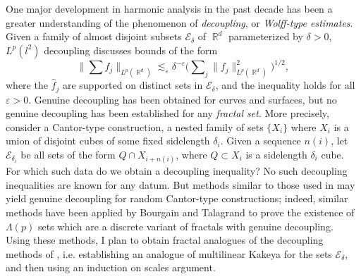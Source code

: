 \documentclass[11pt]{article}
\theoremstyle{definition}
\DeclareMathOperator{\RR}{\mathbb{R}}
\begin{document}
One major development in harmonic analysis in the past decade has been a greater understanding of the phenomenon of \emph{decoupling}, or \emph{Wolff-type estimates}. Given a family of almost disjoint subsets $\mathcal{E}_\delta$ of $\RR^d$ parameterized by $\delta > 0$, $L^p(l^2)$ decoupling discusses bounds of the form
%
\begin{equation} \label{decoupling}
    \Big\| \sum f_j \Big\|_{L^p(\RR^d)} \lesssim_\varepsilon \delta^{-\varepsilon} \Big( \sum\nolimits_j \| f_j \|_{L^p(\RR^d)}^2 \Big)^{1/2},
\end{equation}
%
where the $\widehat{f}_j$ are supported on distinct sets in $\mathcal{E}_\delta$, and the inequality holds for all $\varepsilon > 0$.
Genuine decoupling has been obtained for curves and surfaces, but no genuine decoupling has been established for any \emph{fractal set}. More precisely, consider a Cantor-type construction, a nested family of sets $\{ X_i \}$ where $X_i$ is a union of disjoint cubes of some fixed sidelength $\delta_i$. Given a sequence $n(i)$, let $\mathcal{E}_{\delta_i}$ be all sets of the form $Q \cap X_{i + n(i)}$, where $Q \subset X_i$ is a sidelength $\delta_i$ cube. For which such data do we obtain a decoupling inequality?
No such decoupling inequalities are known for any datum. But methods similar to those used in \cite{DensonFourier} may yield genuine decoupling for random Cantor-type constructions; indeed, similar methods have been applied by Bourgain \cite{Bourgain} and Talagrand \cite{Talagrand} to prove the existence of $\Lambda(p)$ sets %
which are a discrete variant of fractals with genuine decoupling. Using these methods, I plan to obtain fractal analogues of the decoupling methods of \cite{BourgainDemeterStudyGuide}, i.e. establishing an analogue of multilinear Kakeya for the sets $\mathcal{E}_\delta$, and then using an induction on scales argument.

\AtNextBibliography{\footnotesize}
\printbibliography
\end{document}
